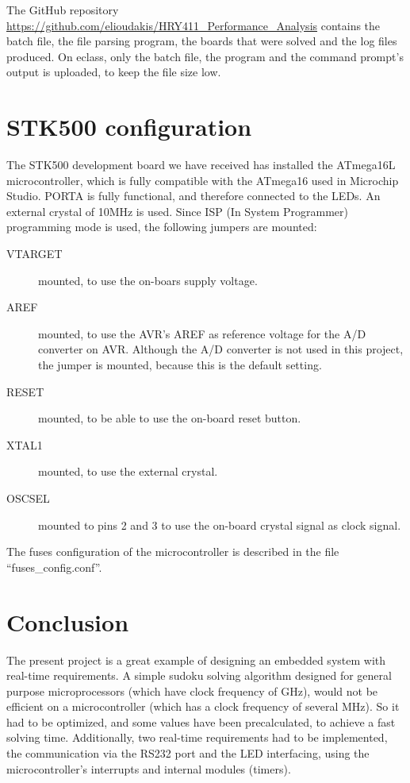 \documentclass[12pt, a4, hidelinks]{article}
\begin{document}
\noindent The GitHub repository \url{https://github.com/elioudakis/HRY411_Performance_Analysis} contains the batch file, the file parsing program, the boards that were solved and the log files produced. On eclass, only the batch file, the program and the command prompt's output is uploaded, to keep the file size low.

\section*{STK500 configuration}
The STK500 development board we have received has installed the ATmega16L microcontroller, which is fully compatible with the ATmega16 used in Microchip Studio. PORTA is fully functional, and therefore connected to the LEDs. An external crystal of 10MHz is used. Since ISP (In System Programmer) programming mode is used, the following jumpers are mounted:
\begin{description}
\item[VTARGET] mounted, to use the on-boars supply voltage.
\item[AREF] mounted, to use the AVR's AREF as reference voltage for the A/D converter on AVR. Although the A/D converter is not used in this project, the jumper is mounted, because this is the default setting.
\item[RESET] mounted, to be able to use the on-board reset button.
\item[XTAL1] mounted, to use the external crystal.
\item[OSCSEL] mounted to pins 2 and 3 to use the on-board crystal signal as clock signal.
\end{description}
The fuses configuration of the microcontroller is described in the file ``fuses\_config.conf''.

\section*{Conclusion}
The present project is a great example of designing an embedded system with real-time requirements. A simple sudoku solving algorithm designed for general purpose microprocessors (which have clock frequency of GHz), would not be efficient on a microcontroller (which has a clock frequency of several MHz). So it had to be optimized, and some values have been precalculated, to achieve a fast solving time. Additionally, two real-time requirements had to be implemented, the communication via the RS232 port and the LED interfacing, using the microcontroller's interrupts and internal modules (timers).
\end{document}
